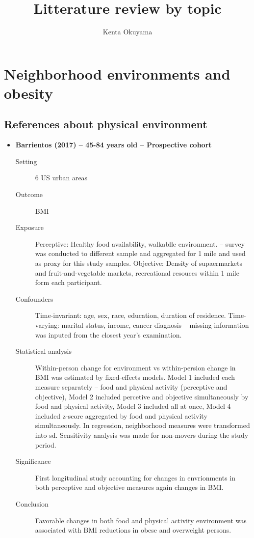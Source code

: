 \documentclass{article}
\title{Litterature review by topic}
\author{Kenta Okuyama}
\begin{document}
\maketitle
\tableofcontents
\newpage
{}

\section{Neighborhood environments and obesity}


\subsection{References about physical environment}

\begin{itemize}
    \item {\bf Barrientos (2017)  -- 45-84 years old -- Prospective cohort}
		\begin{description}
			\item[Setting] 6 US urban areas
			\item[Outcome] BMI
			\item[Exposure] Perceptive: Healthy food availability, walkablle environment. -- survey was conducted to different sample and aggregated for 1 mile and used as proxy for this study samples. Objective: Density of supaermarkets and fruit-and-vegetable markets, recreational resouces within 1 mile form each participant.
			\item[Confounders] Time-invariant: age, sex, race, education, duration of residence. Time-varying: marital status, income, cancer diagnosis -- missing information was inputed from the closest year's examination.  
			\item[Statistical analysis] Within-person change for environment vs within-persion change in BMI was estimated by fixed-effects models. Model 1 included each measure separately -- food and physical activity (perceptive and objective), Model 2 included  percetive and objective simultaneously by food and physical activity, Model 3 included all at once, Model 4 included z-score aggregated by food and physical activity simultaneously. In regression, neighborhood measures were transformed into sd. Sensitivity analysis was made for non-movers during the study period.
    			\item[Significance] First longitudinal study accounting for changes in envrionments in both perceptive and objective measures again changes in BMI. 
    			\item[Conclusion] Favorable changes in both food and physical activity environment  was associated with BMI reductions in obese and overweight persons.

\end{description}
\end{itemize}
\end{document}
